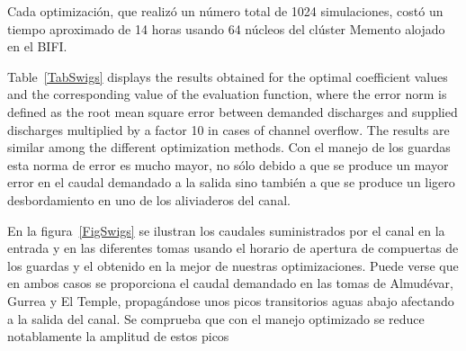 \documentclass[review,authoryear]{elsarticle}
\begin{document}
Cada optimización, que realizó un número total de 1024 simulaciones, costó un
tiempo aproximado de 14 horas usando 64 núcleos del clúster Memento alojado en
el BIFI.

Table~\ref{TabSwigs} displays the results obtained for the optimal coefficient
values and the corresponding value of the evaluation function, where the error
norm is defined as the root mean square error between demanded discharges and
supplied discharges multiplied by a factor 10 in cases of channel overflow.
The results are similar among the different optimization methods. Con el manejo
de los guardas esta norma de error es mucho mayor, no sólo debido a que se
produce un mayor error en el caudal demandado a la salida sino también a que se
produce un ligero desbordamiento en uno de los aliviaderos del canal.

En la figura~\ref{FigSwigs} se ilustran los caudales suministrados por el canal
en la entrada y en las diferentes tomas usando el horario de apertura de
compuertas de los guardas y el obtenido en la mejor de nuestras optimizaciones.
Puede verse que en ambos casos se proporciona el caudal demandado en las tomas
de Almudévar, Gurrea y El Temple, propagándose unos picos transitorios aguas
abajo afectando a la salida del canal. Se comprueba que con el manejo optimizado
se reduce notablamente la amplitud de estos picos
\end{document}
